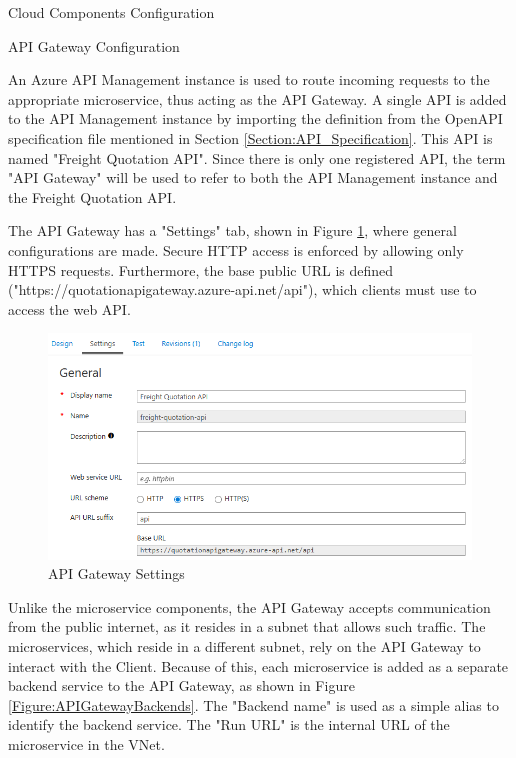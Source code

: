 \documentclass[12pt, reqno]{amsbook}
\makeatletter
\def\section{\@startsection{section}{1}%
      \z@{.5\linespacing\@plus.7\linespacing}{.25\linespacing}%
      {\normalfont\bfseries\flushleft}}
\def\subsection{\@startsection{subsection}{2}%
      \z@{.5\linespacing\@plus.7\linespacing}{.25\linespacing}%
      {\normalfont\bfseries\flushleft}}
\theoremstyle{definition}
\theoremstyle{definition}
\numberwithin{section}{chapter}
\numberwithin{table}{chapter}
\numberwithin{figure}{chapter}
\makeatother
\begin{document}
\section{Cloud Components Configuration}

\subsection{API Gateway Configuration}
\label{Subsection:API_Gateway_Configuration}

An Azure \ac{API} Management instance is used to route incoming requests to the appropriate microservice, thus acting as the \ac{API} Gateway. A single \ac{API} is added to the \Ac{API} Management instance by importing the definition from the OpenAPI specification file mentioned in Section \ref{Section:API_Specification}. This \ac{API} is named "Freight Quotation API". Since there is only one registered \ac{API}, the term "API Gateway" will be used to refer to both the \ac{API} Management instance and the Freight Quotation API.

The \ac{API} Gateway has a "Settings" tab, shown in Figure \ref{Figure:APIGatewaySettings}, where general configurations are made. Secure \ac{HTTP} access is enforced by allowing only \ac{HTTPS} requests. Furthermore, the base public \ac{URL} is defined ("https://quotationapigateway.azure-api.net/api"), which clients must use to access the web \ac{API}.

\begin{figure}[H]
  \centering
  \includegraphics[width=0.9\linewidth]{images/APIGatewaySettings.png}
  \caption{\label{Figure:APIGatewaySettings}API Gateway Settings}
\end{figure}

Unlike the microservice components, the \ac{API} Gateway accepts communication from the public internet, as it resides in a subnet that allows such traffic. The microservices, which reside in a different subnet, rely on the \ac{API} Gateway to interact with the Client. Because of this, each microservice is added as a separate backend service to the \ac{API} Gateway, as shown in Figure \ref{Figure:APIGatewayBackends}. The "Backend name" is used as a simple alias to identify the backend service. The "Run URL" is the internal \ac{URL} of the microservice in the \ac{VNet}.
\end{document}
